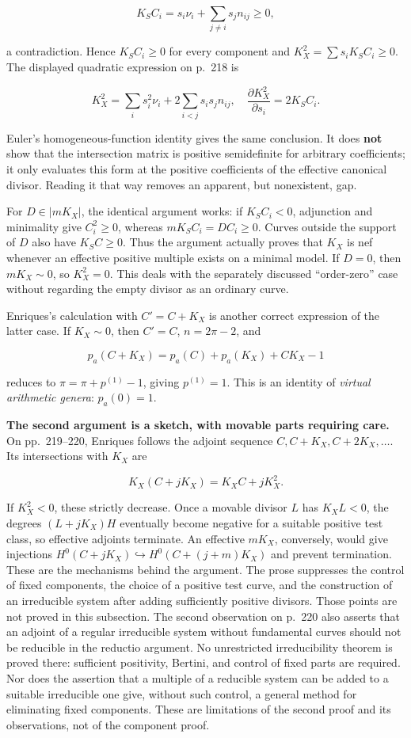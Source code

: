 \[
K_SC_i=s_i\nu_i+\sum_{j\ne i}s_jn_{ij}\geq0,
\]

a contradiction. Hence \(K_SC_i\geq0\) for every component and \(K_X^2=\sum s_iK_SC_i\geq0\). The displayed quadratic expression on p.~218 is

\[
K_X^2=\sum_i s_i^2\nu_i+2\sum_{i<j}s_is_jn_{ij},
\quad
\frac{\partial K_X^2}{\partial s_i}=2K_SC_i.
\]

Euler's homogeneous-function identity gives the same conclusion. It does \textbf{not} show that the intersection matrix is positive semidefinite for arbitrary coefficients; it only evaluates this form at the positive coefficients of the effective canonical divisor. Reading it that way removes an apparent, but nonexistent, gap.

For \(D\in|mK_X|\), the identical argument works: if \(K_SC_i<0\), adjunction and minimality give \(C_i^2\geq0\), whereas \(mK_SC_i=D C_i\geq0\). Curves outside the support of \(D\) also have \(K_SC\geq0\). Thus the argument actually proves that \(K_X\) is nef whenever an effective positive multiple exists on a minimal model. If \(D=0\), then \(mK_X\sim0\), so \(K_X^2=0\). This deals with the separately discussed ``order-zero'' case without regarding the empty divisor as an ordinary curve.

Enriques's calculation with \(C'=C+K_X\) is another correct expression of the latter case. If \(K_X\sim0\), then \(C'=C\), \(n=2\pi-2\), and

\[
p_a(C+K_X)=p_a(C)+p_a(K_X)+C K_X-1
\]

reduces to \(\pi=\pi+p^{(1)}-1\), giving \(p^{(1)}=1\). This is an identity of \emph{virtual arithmetic genera}: \(p_a(0)=1\).

\textbf{The second argument is a sketch, with movable parts requiring care.} On pp.~219--220, Enriques follows the adjoint sequence \(C,C+K_X,C+2K_X,\ldots\). Its intersections with \(K_X\) are

\[
K_X(C+jK_X)=K_X C+jK_X^2.
\]

If \(K_X^2<0\), these strictly decrease. Once a movable divisor \(L\) has \(K_X L<0\), the degrees \((L+jK_X)H\) eventually become negative for a suitable positive test class, so effective adjoints terminate. An effective \(mK_X\), conversely, would give injections \(H^0(C+jK_X)\hookrightarrow H^0(C+(j+m)K_X)\) and prevent termination. These are the mechanisms behind the argument. The prose suppresses the control of fixed components, the choice of a positive test curve, and the construction of an irreducible system after adding sufficiently positive divisors. Those points are not proved in this subsection. The second observation on p.~220 also asserts that an adjoint of a regular irreducible system without fundamental curves should not be reducible in the reductio argument. No unrestricted irreducibility theorem is proved there: sufficient positivity, Bertini, and control of fixed parts are required. Nor does the assertion that a multiple of a reducible system can be added to a suitable irreducible one give, without such control, a general method for eliminating fixed components. These are limitations of the second proof and its observations, not of the component proof.

